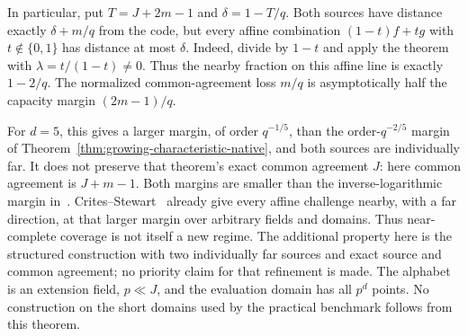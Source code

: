 In particular, put $T=J+2m-1$ and $\delta=1-T/q$.
Both sources have distance exactly $\delta+m/q$ from the code,
but every affine combination $(1-t)f+tg$ with $t\notin\{0,1\}$
has distance at most $\delta$. Indeed, divide by $1-t$ and apply
the theorem with $\lambda=t/(1-t)\ne0$.
Thus the nearby fraction on this affine line is exactly $1-2/q$.
The normalized common-agreement loss $m/q$ is asymptotically half
the capacity margin $(2m-1)/q$.

For $d=5$, this gives a larger margin, of order $q^{-1/5}$, than
the order-$q^{-2/5}$ margin of
Theorem~\ref{thm:growing-characteristic-native}, and both sources
are individually far. It does not preserve that theorem's exact
common agreement $J$: here common agreement is $J+m-1$.
Both margins are smaller than the inverse-logarithmic margin in~\cite{kkh}.
Crites--Stewart~\cite[Corollary~1]{crites-stewart2025} already give
every affine challenge nearby, with a far direction, at that larger
margin over arbitrary fields and domains. Thus near-complete coverage
is not itself a new regime. The additional property here is the
structured construction with two individually far sources and exact
source and common agreement; no priority claim for that refinement
is made. The alphabet is an extension field, $p\ll J$, and the
evaluation domain has all $p^d$ points. No construction on the short
domains used by the practical benchmark follows from this theorem.
